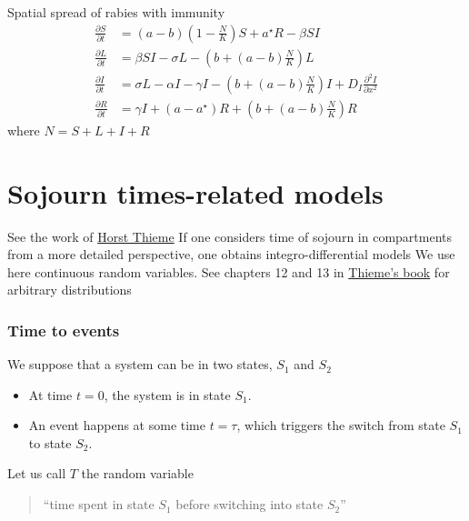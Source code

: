 \documentclass[aspectratio=169]{beamer}\usepackage[]{graphicx}\usepackage[]{xcolor}
\begin{document}

\begin{frame}{Spatial spread of rabies with immunity}
\begin{subequations}
\label{sys:rabies}
\begin{align}
\frac{\partial S}{\partial t} &= 
(a-b)\left(1-\frac NK\right)S+a^\star R-\beta SI \label{sys:rabies_S} \\
\frac{\partial L}{\partial t} &= 
\beta SI-\sigma L-\left(b+(a-b)\frac NK\right)L \label{sys:rabies_L} \\
\frac{\partial I}{\partial t} &= 
\sigma L-\alpha I-\gamma I-\left(b+(a-b)\frac NK\right)I 
+ D_I\frac{\partial^2 I}{\partial x^2} \label{sys:rabies_I} \\
\frac{\partial R}{\partial t} &= 
\gamma I+(a-a^\star)R+\left(b+(a-b)\frac NK\right)R \label{sys:rabies_R}
\end{align}
\end{subequations}
where $N=S+L+I+R$
\end{frame}

\section{Sojourn times-related models}

\begin{frame}
See the work of \href{https://scholar.google.ca/citations?user=o7R6ZHMAAAAJ}{Horst Thieme}
\vfill
If one considers time of sojourn in compartments from a more detailed perspective, one obtains integro-differential models
\vfill
We use here continuous random variables. See chapters 12 and 13 in \href{https://press.princeton.edu/books/paperback/9780691092911/mathematics-in-population-biology}{Thieme's book} for arbitrary distributions
\end{frame}


\begin{frame}\frametitle{Time to events}
We suppose that a system can be in two states, $S_1$ and $S_2$
\begin{itemize}
\item At time $t=0$, the system is in state $S_1$.
\item An event happens at some time $t=\tau$, which triggers the switch from
state $S_1$ to state $S_2$.
\end{itemize}
\vfill
Let us call $T$ the random variable 
\begin{quote}
``time spent in state $S_1$ before switching into state $S_2$''
\end{quote}
\end{frame}
\end{document}
